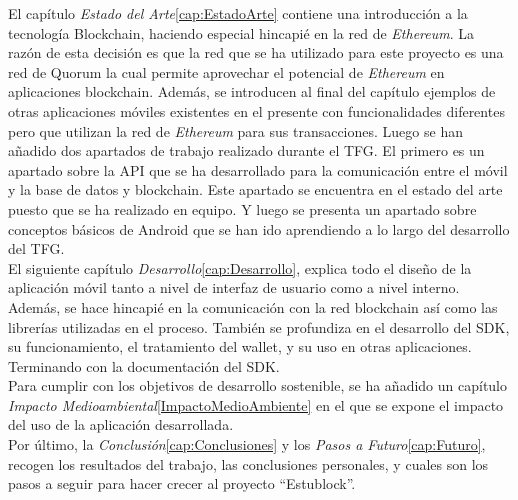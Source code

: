 El capítulo \emph{Estado del Arte}\ref{cap:EstadoArte} contiene una introducción a la tecnología Blockchain, haciendo especial hincapié en la red de \emph{Ethereum}\cite{webEthereum}. La razón de esta decisión es que la red que se ha utilizado para este proyecto es una red de Quorum\cite{webQuorum} la cual permite aprovechar el potencial de \emph{Ethereum} en aplicaciones blockchain. Además, se introducen al final del capítulo ejemplos de otras aplicaciones móviles existentes en el presente con funcionalidades diferentes pero que utilizan la red de \emph{Ethereum} para sus transacciones. Luego se han añadido dos apartados de trabajo realizado durante el TFG. El primero es un apartado sobre la API que se ha desarrollado para la comunicación entre el móvil y la base de datos y blockchain. Este apartado se encuentra en el estado del arte puesto que se ha realizado en equipo. Y luego se presenta un apartado sobre conceptos básicos de Android que se han ido aprendiendo a lo largo del desarrollo del TFG. \\

El siguiente capítulo \emph{Desarrollo}\ref{cap:Desarrollo}, explica todo el diseño de la aplicación móvil tanto a nivel de interfaz de usuario como a nivel interno. Además, se hace hincapié en la comunicación con la red blockchain así como las librerías utilizadas en el proceso. También se profundiza en el desarrollo del SDK, su funcionamiento, el tratamiento del wallet, y su uso en otras aplicaciones. Terminando con la documentación del SDK. \\

Para cumplir con los objetivos de desarrollo sostenible, se ha añadido un capítulo \emph{Impacto Medioambiental}\ref{ImpactoMedioAmbiente} en el que se expone el impacto del uso de la aplicación desarrollada. \\

Por último, la \emph{Conclusión}\ref{cap:Conclusiones} y los \emph{Pasos a Futuro}\ref{cap:Futuro}, recogen los resultados del trabajo, las conclusiones personales, y cuales son los pasos a seguir para hacer crecer al proyecto ``Estublock''.


